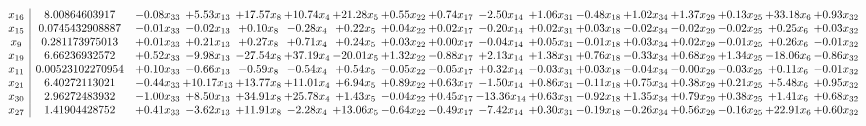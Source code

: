 \documentclass[9pt]{article}
\begin{document}
\[\begin{array}{c| c c@{\hskip 2pt} c@{\hskip 2pt} c@{\hskip 2pt} c@{\hskip 2pt} c@{\hskip 2pt} c@{\hskip 2pt} c@{\hskip 2pt} c@{\hskip 2pt} c@{\hskip 2pt} c@{\hskip 2pt} c@{\hskip 2pt} c@{\hskip 2pt} c@{\hskip 2pt} c@{\hskip 2pt} c@{\hskip 2pt} }
 x_{16}   &  8.00864603917 & -0.08 x_{33} & +  5.53 x_{13} & + 17.57 x_{8} & + 10.74 x_{4} & + 21.28 x_{5} & +  0.55 x_{22} & +  0.74 x_{17} & -2.50 x_{14} & +  1.06 x_{31} & -0.48 x_{18} & +  1.02 x_{34} & +  1.37 x_{29} & +  0.13 x_{25} & + 33.18 x_{6} & +  0.93 x_{32}\\
 x_{15}   &  0.0745432908887 & -0.01 x_{33} & -0.02 x_{13} & +  0.10 x_{8} & -0.28 x_{4} & +  0.22 x_{5} & +  0.04 x_{22} & +  0.02 x_{17} & -0.20 x_{14} & +  0.02 x_{31} & +  0.03 x_{18} & -0.02 x_{34} & -0.02 x_{29} & -0.02 x_{25} & +  0.25 x_{6} & +  0.03 x_{32}\\
 x_{9}   &  0.281173975013 & +  0.01 x_{33} & +  0.21 x_{13} & +  0.27 x_{8} & +  0.71 x_{4} & +  0.24 x_{5} & +  0.03 x_{22} & +  0.00 x_{17} & -0.04 x_{14} & +  0.05 x_{31} & -0.01 x_{18} & +  0.03 x_{34} & +  0.02 x_{29} & -0.01 x_{25} & +  0.26 x_{6} & -0.01 x_{32}\\
 x_{19}   &  6.66236932572 & +  0.52 x_{33} & -9.98 x_{13} & -27.54 x_{8} & + 37.19 x_{4} & -20.01 x_{5} & +  1.32 x_{22} & -0.88 x_{17} & +  2.13 x_{14} & +  1.38 x_{31} & +  0.76 x_{18} & -0.33 x_{34} & +  0.68 x_{29} & +  1.34 x_{25} & -18.06 x_{6} & -0.86 x_{32}\\
 x_{11}   &  0.00523102270954 & +  0.10 x_{33} & -0.66 x_{13} & -0.59 x_{8} & -0.54 x_{4} & +  0.54 x_{5} & -0.05 x_{22} & -0.05 x_{17} & +  0.32 x_{14} & -0.03 x_{31} & +  0.03 x_{18} & -0.04 x_{34} & -0.00 x_{29} & -0.03 x_{25} & +  0.11 x_{6} & -0.01 x_{32}\\
 x_{21}   &  6.40272113021 & -0.44 x_{33} & + 10.17 x_{13} & + 13.77 x_{8} & + 11.01 x_{4} & +  6.94 x_{5} & +  0.89 x_{22} & +  0.63 x_{17} & -1.50 x_{14} & +  0.86 x_{31} & -0.11 x_{18} & +  0.75 x_{34} & +  0.38 x_{29} & +  0.21 x_{25} & +  5.48 x_{6} & +  0.95 x_{32}\\
 x_{30}   &  2.96272483932 & -1.00 x_{33} & +  8.50 x_{13} & + 34.91 x_{8} & + 25.78 x_{4} & +  1.43 x_{5} & -0.04 x_{22} & +  0.45 x_{17} & -13.36 x_{14} & +  0.63 x_{31} & -0.92 x_{18} & +  1.35 x_{34} & +  0.79 x_{29} & +  0.38 x_{25} & +  1.41 x_{6} & +  0.68 x_{32}\\
 x_{27}   &  1.41904428752 & +  0.41 x_{33} & -3.62 x_{13} & + 11.91 x_{8} & -2.28 x_{4} & + 13.06 x_{5} & -0.64 x_{22} & -0.49 x_{17} & -7.42 x_{14} & +  0.30 x_{31} & -0.19 x_{18} & -0.26 x_{34} & +  0.56 x_{29} & -0.16 x_{25} & + 22.91 x_{6} & +  0.60 x_{32}\\

\end{array}\]
\end{document}
